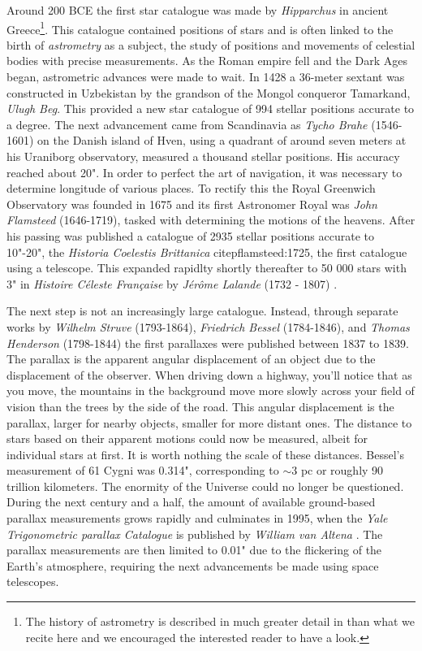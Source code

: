 Around 200 BCE the first star catalogue was made by \textit{Hipparchus} in ancient Greece\footnote{The history of astrometry is described in much greater detail in \cite{perryman:12} than what we recite here and we encouraged the interested reader to have a look.}. This catalogue contained positions of stars and is often linked to the birth of \textit{astrometry} as a subject, the study of positions and movements of celestial bodies with precise measurements. As the Roman empire fell and the Dark Ages began, astrometric advances were made to wait. In 1428 a 36-meter sextant was constructed in Uzbekistan by the grandson of the Mongol conqueror Tamarkand, \textit{Ulugh Beg}. This provided a new star catalogue of 994 stellar positions accurate to a degree. The next advancement came from Scandinavia as \textit{Tycho Brahe} (1546-1601) on the Danish island of Hven, using a quadrant of around seven meters at his Uraniborg observatory, measured a thousand stellar positions. His accuracy reached about 20". In order to perfect the art of navigation, it was necessary to determine longitude of various places. To rectify this the Royal Greenwich Observatory was founded in 1675 and its first Astronomer Royal was \textit{John Flamsteed} (1646-1719), tasked with determining the motions of the heavens. After his passing was published a catalogue of 2935 stellar positions accurate to 10"-20", the \textit{Historia Coelestis Brittanica} citep{flamsteed:1725}, the first catalogue using a telescope. This expanded rapidlty shortly thereafter to 50 000 stars with 3" in \textit{Histoire Céleste Française} by \textit{Jérôme Lalande} (1732 - 1807) \citep{lalande:1801}. 

The next step is not an increasingly large catalogue. Instead, through separate works by \textit{Wilhelm Struve} (1793-1864), \textit{Friedrich Bessel} (1784-1846), and \textit{Thomas Henderson} (1798-1844) the first parallaxes were published between 1837 to 1839. The parallax is the apparent angular displacement of an object due to the displacement of the observer. When driving down a highway, you'll notice that as you move, the mountains in the background move more slowly across your field of vision than the trees by the side of the road. This angular displacement is the parallax, larger for nearby objects, smaller for more distant ones. The distance to stars based on their apparent motions could now be measured, albeit for individual stars at first. It is worth nothing the scale of these distances. Bessel's measurement of 61 Cygni was 0.314", corresponding to ${\sim}3$ pc or roughly 90 trillion kilometers. The enormity of the Universe could no longer be questioned. During the next century and a half, the amount of available ground-based parallax measurements grows rapidly and culminates in 1995, when the \textit{Yale Trigonometric parallax Catalogue} is published by \textit{William van Altena} \citep{vanaltena:95}. The parallax measurements are then limited to 0.01" due to the flickering of the Earth's atmosphere, requiring the next advancements be made using space telescopes.

